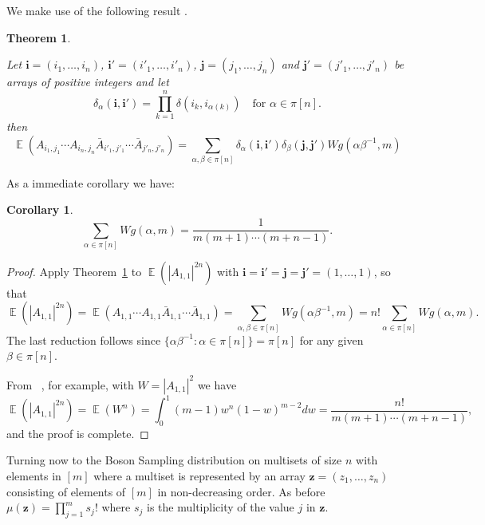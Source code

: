 \documentclass[a4paper,11pt]{article}
\newtheorem{thm}{Theorem}
\newtheorem{corollary}{Corollary}
\newcommand{\EX}{\mathop{{}\mathbb{E}}}
\def\BS/{Boson Sampling}
\begin{document}
We make use of the following result
\vspace{1em}
\citep{collins2003moments,collins2006integration}.
\begin{thm}\label{thm:Collins}
	
	Let $\mathbf{i} = (i_1,\dots,i_n)$, $\mathbf{i'} = (i'_1,\dots,i'_n)$, $\mathbf{j} = (j_1,\dots,j_n)$ and $\mathbf{j'} = (j'_1,\dots,j'_n)$ be arrays of positive integers  and let
	$$ \delta_\alpha(\mathbf{i,i'}) = \prod_{k=1}^n \delta(i_k,i_{\alpha(k)}) \quad \text{for $\alpha \in \pi[n]$}.$$  
	then
	$$\EX (A_{i_1,j_1}\cdots A_{i_n,j_n}\bar{A}_{i'_1,j'_1}\cdots \bar{A}_{j'_n,j'_n}) 
	= \sum_{\alpha,\beta \in \pi[n]} \delta_\alpha(\mathbf{i,i'}) \delta_\beta(\mathbf{j,j'}) W\!g(\alpha \beta^{-1},m)$$
\end{thm}  
As a immediate corollary we have:
\vspace{0.5em} 
\begin{corollary}\label{cor:X}
	$$\sum_{\alpha \in \pi[n]} W\!g(\alpha,m) = \frac{1}{m(m+1)\cdots(m + n -1)}.$$
\end{corollary}
\begin{proof}
	Apply Theorem~\ref{thm:Collins} to $\EX(|A_{1,1}|^{2n})$ with $\mathbf{i}=\mathbf{i'} = \mathbf{j}=\mathbf{j'}= (1,\dots,1)$, so that 
	$$\EX( |A_{1,1}|^{2n}) = \EX(A_{1,1}\cdots A_{1,1}\bar{A}_{1,1}\cdots \bar{A}_{1,1}) = \sum_{\alpha,\beta \in \pi[n]} W\!g(\alpha \beta^{-1},m) = n!\sum_{\alpha \in \pi[n]} W\!g(\alpha ,m).$$
	The last reduction follows since  $\{\alpha \beta^{-1} : \alpha \in \pi[n]\} = \pi[n]$ for any given $\beta \in \pi[n]$. 
	
	From ~\citep{PetzRaffey:2004}, for example, with $W = |A_{1,1}|^2$  we have
	$$\EX (|A_{1,1}|^{2n}) = \EX (W^n) = \int_0^1 (m-1) w^n (1-w)^{m-2} dw = \frac{n!}{m(m+1)\cdots (m+n-1)},$$
	and the proof is complete.   
\end{proof}
Turning now to the \BS/ distribution on multisets of size $n$ with elements in $[m]$ where a multiset is represented by an array  $\mathbf{z} = (z_1,\dots,z_n)$ consisting of elements of $[m]$ in non-decreasing order.  
As before $\mu(\mathbf{z}) = \prod_{j=1}^m s_j!$ where $s_j$ is the multiplicity of the value $j$ in $\mathbf{z}$.
\end{document}
